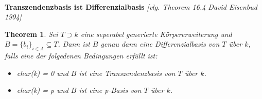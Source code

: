 \documentclass[10pt,a4paper]{report}
\newcommand{\comment}[1]{}
\newcommand{\ModulsOfDifferenzials}{David Eisenbud 1994}
\newcounter{Aussage}[chapter]
\newtheorem{theorem}[Aussage]{Theorem}
\begin{document}
\ \\
\textbf{Transzendenzbasis ist Differenzialbasis} \textit{[vlg. Theorem 16.4 \ModulsOfDifferenzials]}
\begin{theorem}\comment{\label{Transzendenzbasis ist Differenzialbasis}}
Sei $T \supset k$ eine seperabel generierte Körpererweiterung und $B = \lbrace b_i \rbrace_{i \in \Lambda} \subseteq T$. Dann ist $B$ genau dann eine Differenzialbasis von $T$ über $k$, falls eine der folgedenen Bedingungen erfüllt ist:
\begin{itemize}
\item[\textbf{1.}] char(k) = 0 und $B$ ist eine Transzendenzbasis von $T$ über $k$.
\item[\textbf{2.}] char(k) = p und $B$ ist eine p-Basis von $T$ über $k$.
\end{itemize}
\end{theorem}
\end{document}

